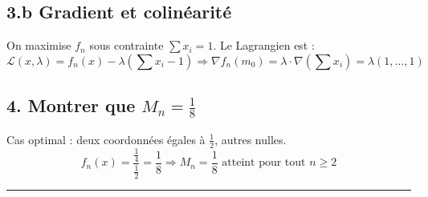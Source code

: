 \documentclass[a4paper,12pt]{article}
\begin{document}
\subsection*{3.b Gradient et colinéarité}

On maximise \(f_n\) sous contrainte \(\sum x_i = 1\). Le Lagrangien est :
\[
\mathcal{L}(x, \lambda) = f_n(x) - \lambda \left(\sum x_i - 1\right)
\Rightarrow
\nabla f_n(m_0) = \lambda \cdot \nabla \left(\sum x_i\right) = \lambda (1, \dots, 1)
\]

\subsection*{4. Montrer que \(M_n = \frac{1}{8}\)}

Cas optimal : deux coordonnées égales à \(\frac{1}{2}\), autres nulles.
\[
f_n(x) = \frac{\frac{1}{4}}{\frac{1}{2}} = \frac{1}{8}
\Rightarrow \boxed{M_n = \frac{1}{8}} \text{ atteint pour tout } n \geq 2
\]


\vspace{1em}
\hrule
\vspace{1em}

\end{document}
